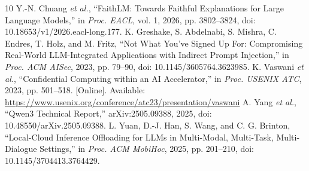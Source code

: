 \begin{thebibliography}{10}
 Y.-N. Chuang \emph{et al.}, ``FaithLM: Towards Faithful Explanations for Large Language Models,'' in \emph{Proc. EACL}, vol. 1, 2026, pp. 3802--3824, doi: 10.18653/v1/2026.eacl-long.177.
 K. Greshake, S. Abdelnabi, S. Mishra, C. Endres, T. Holz, and M. Fritz, ``Not What You've Signed Up For: Compromising Real-World LLM-Integrated Applications with Indirect Prompt Injection,'' in \emph{Proc. ACM AISec}, 2023, pp. 79--90, doi: 10.1145/3605764.3623985.
 K. Vaswani \emph{et al.}, ``Confidential Computing within an AI Accelerator,'' in \emph{Proc. USENIX ATC}, 2023, pp. 501--518. [Online]. Available: \url{https://www.usenix.org/conference/atc23/presentation/vaswani}
 A. Yang \emph{et al.}, ``Qwen3 Technical Report,'' arXiv:2505.09388, 2025, doi: 10.48550/arXiv.2505.09388.
 L. Yuan, D.-J. Han, S. Wang, and C. G. Brinton, ``Local-Cloud Inference Offloading for LLMs in Multi-Modal, Multi-Task, Multi-Dialogue Settings,'' in \emph{Proc. ACM MobiHoc}, 2025, pp. 201--210, doi: 10.1145/3704413.3764429.
\end{thebibliography}
